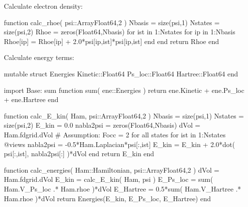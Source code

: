 Calculate electron density:
\begin{juliacode}
function calc_rhoe( psi::Array{Float64,2} )
  Nbasis = size(psi,1)
  Nstates = size(psi,2)
  Rhoe = zeros(Float64,Nbasis)
  for ist in 1:Nstates
    for ip in 1:Nbasis
      Rhoe[ip] = Rhoe[ip] + 2.0*psi[ip,ist]*psi[ip,ist]
    end
  end
  return Rhoe
end
\end{juliacode}

Calculate energy terms:
\begin{juliacode}
mutable struct Energies
  Kinetic::Float64
  Ps_loc::Float64
  Hartree::Float64
end

import Base: sum
function sum( ene::Energies )
  return ene.Kinetic + ene.Ps_loc + ene.Hartree
end

function calc_E_kin( Ham, psi::Array{Float64,2} )
  Nbasis = size(psi,1)
  Nstates = size(psi,2)
  E_kin = 0.0
  nabla2psi = zeros(Float64,Nbasis)
  dVol = Ham.fdgrid.dVol
  # Assumption: Focc = 2 for all states
  for ist in 1:Nstates
    @views nabla2psi = -0.5*Ham.Laplacian*psi[:,ist]
    E_kin = E_kin + 2.0*dot( psi[:,ist], nabla2psi[:] )*dVol
  end
  return E_kin
end

function calc_energies( Ham::Hamiltonian, psi::Array{Float64,2} )
  dVol = Ham.fdgrid.dVol
  E_kin = calc_E_kin( Ham, psi )
  E_Ps_loc = sum( Ham.V_Ps_loc .* Ham.rhoe )*dVol
  E_Hartree = 0.5*sum( Ham.V_Hartree .* Ham.rhoe )*dVol
  return Energies(E_kin, E_Ps_loc, E_Hartree)
end
\end{juliacode}

